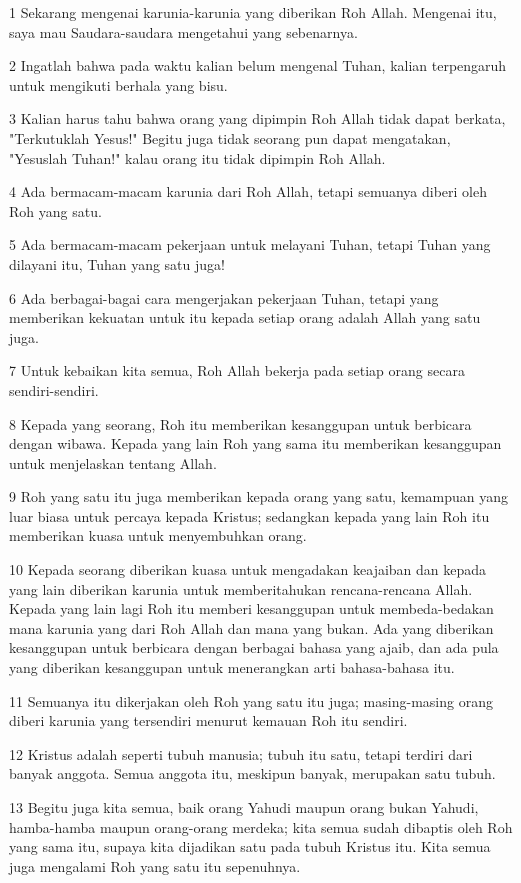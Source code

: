 \par 1 Sekarang mengenai karunia-karunia yang diberikan Roh Allah. Mengenai itu, saya mau Saudara-saudara mengetahui yang sebenarnya.
\par 2 Ingatlah bahwa pada waktu kalian belum mengenal Tuhan, kalian terpengaruh untuk mengikuti berhala yang bisu.
\par 3 Kalian harus tahu bahwa orang yang dipimpin Roh Allah tidak dapat berkata, "Terkutuklah Yesus!" Begitu juga tidak seorang pun dapat mengatakan, "Yesuslah Tuhan!" kalau orang itu tidak dipimpin Roh Allah.
\par 4 Ada bermacam-macam karunia dari Roh Allah, tetapi semuanya diberi oleh Roh yang satu.
\par 5 Ada bermacam-macam pekerjaan untuk melayani Tuhan, tetapi Tuhan yang dilayani itu, Tuhan yang satu juga!
\par 6 Ada berbagai-bagai cara mengerjakan pekerjaan Tuhan, tetapi yang memberikan kekuatan untuk itu kepada setiap orang adalah Allah yang satu juga.
\par 7 Untuk kebaikan kita semua, Roh Allah bekerja pada setiap orang secara sendiri-sendiri.
\par 8 Kepada yang seorang, Roh itu memberikan kesanggupan untuk berbicara dengan wibawa. Kepada yang lain Roh yang sama itu memberikan kesanggupan untuk menjelaskan tentang Allah.
\par 9 Roh yang satu itu juga memberikan kepada orang yang satu, kemampuan yang luar biasa untuk percaya kepada Kristus; sedangkan kepada yang lain Roh itu memberikan kuasa untuk menyembuhkan orang.
\par 10 Kepada seorang diberikan kuasa untuk mengadakan keajaiban dan kepada yang lain diberikan karunia untuk memberitahukan rencana-rencana Allah. Kepada yang lain lagi Roh itu memberi kesanggupan untuk membeda-bedakan mana karunia yang dari Roh Allah dan mana yang bukan. Ada yang diberikan kesanggupan untuk berbicara dengan berbagai bahasa yang ajaib, dan ada pula yang diberikan kesanggupan untuk menerangkan arti bahasa-bahasa itu.
\par 11 Semuanya itu dikerjakan oleh Roh yang satu itu juga; masing-masing orang diberi karunia yang tersendiri menurut kemauan Roh itu sendiri.
\par 12 Kristus adalah seperti tubuh manusia; tubuh itu satu, tetapi terdiri dari banyak anggota. Semua anggota itu, meskipun banyak, merupakan satu tubuh.
\par 13 Begitu juga kita semua, baik orang Yahudi maupun orang bukan Yahudi, hamba-hamba maupun orang-orang merdeka; kita semua sudah dibaptis oleh Roh yang sama itu, supaya kita dijadikan satu pada tubuh Kristus itu. Kita semua juga mengalami Roh yang satu itu sepenuhnya.
